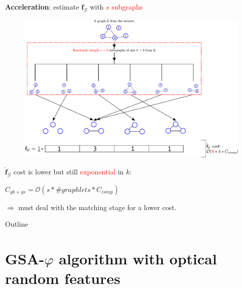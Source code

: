 \documentclass{beamer}
\begin{document}
\begin{frame}{\textbf{Acceleration}: estimate $\mathbf{f}_\mathcal{G}$ with \textcolor{red}{$s$ subgraphs}}
	\footnotesize
	\begin{figure}[H]
		\centering
		\includegraphics[scale=0.45]{figs/gk_accelerated.pdf}
		\vfill
	\end{figure}
	$\hat{\mathbf{f}}_\mathcal{G}$ cost is lower but still  \textcolor{red}{exponential}  in $k$:
	
	
	{\centering$C_{gk+gs}=\mathcal{O}(s*\#graphlets*C_{comp})$\par}
	
	
	$\Rightarrow$ must deal with the matching stage for a lower cost.
\end{frame}

\begin{frame}{Outline}
	\tiny
	\tableofcontents
\end{frame}

\section{GSA-$\varphi$ algorithm with optical random features}
\end{document}
